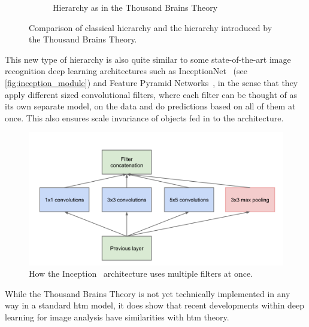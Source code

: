 \begin{figure}[H]
\begin{subfigure}[t]{0.3\textwidth}
        \caption{Hierarchy as in the Thousand Brains Theory}
        \label{}
    \end{subfigure}
    \caption[Thousand Brains Visualization]{Comparison of classical hierarchy and the hierarchy introduced by the Thousand Brains Theory.}
\end{figure}
This new type of hierarchy is also quite similar to some state-of-the-art image recognition deep learning architectures such as InceptionNet~\cite{inceptionnet} (see \autoref{fig:inception_module}) and Feature Pyramid Networks~\cite{fpn}, in the sense that they apply different sized convolutional filters, where each filter can be thought of as its own separate model, on the data and do predictions based on all of them at once. This also ensures scale invariance of objects fed in to the architecture.
\begin{figure}[H]
    \centering
    \includegraphics[width=\linewidth]{resources/models/inception_module.png}
    \caption[Filter Concatenation]{How the Inception~\cite{inceptionnet} architecture uses multiple filters at once.}
    \label{fig:inception_module}
\end{figure}

While the Thousand Brains Theory is not yet technically implemented in any way in a standard \gls*{htm} model, it does show that recent developments within deep learning for image analysis have similarities with \gls*{htm} theory.

